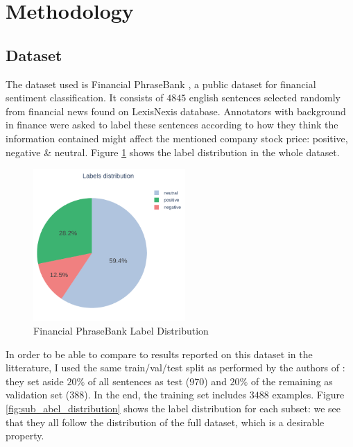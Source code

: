 \documentclass[final]{cvpr}
\begin{document}

\section{Methodology}

\subsection{Dataset}

The dataset used is Financial PhraseBank \cite{malo}, a public dataset for financial sentiment classification. It consists of $4845$ english sentences selected randomly from financial news found on LexisNexis database. Annotators with background in finance were asked to label these sentences according to how they think the information contained might affect the mentioned company stock price: positive, negative \& neutral. Figure \ref{fig:label_distribution} shows the label distribution in the whole dataset. 

\begin{figure}[h!]
	\centering
	\includegraphics[width=5.8cm]{fig/label_distribution.pdf}
	\caption{Financial PhraseBank Label Distribution}
	\label{fig:label_distribution}
\end{figure}

In order to be able to compare to results reported on this dataset in the litterature, I used the same train/val/test split as performed by the authors of \cite{FinBERT}: they set aside $20\%$ of all sentences as test ($970$) and $20\%$ of the remaining as validation set ($388$). In the end, the training set includes $3488$ examples. Figure \ref{fig:sub_abel_distribution} shows the label distribution for each subset: we see that they all follow the distribution of the full dataset, which is a desirable property.
\end{document}

